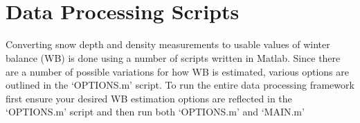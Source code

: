 \documentclass{sfuthesis}
\begin{document}
\begin{appendices}
\\
\\


\chapter{Data Processing Scripts}

Converting snow depth and density measurements to usable values of winter balance (WB) is done using a number of scripts written in Matlab. Since there are a number of possible variations for how WB is estimated, various options are outlined in the `OPTIONS.m' script. To run the entire data processing framework first ensure your desired WB estimation options are reflected in the `OPTIONS.m' script and then run both `OPTIONS.m' and `MAIN.m'


\end{appendices}
\end{document}
